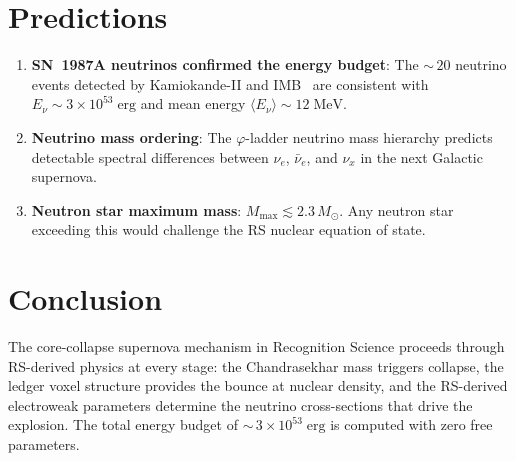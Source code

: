 \documentclass[12pt,a4paper]{article}
\theoremstyle{definition}
\theoremstyle{remark}
\begin{document}
\section{Predictions}
\label{sec:predictions}

\begin{enumerate}
  \item \textbf{SN~1987A neutrinos confirmed the energy budget}:
  The ${\sim}\,20$ neutrino events detected by Kamiokande-II and
  IMB~\cite{Hirata1987} are consistent with
  $E_\nu \sim 3 \times 10^{53}\;\mathrm{erg}$ and mean energy
  $\langle E_\nu \rangle \sim 12\;\mathrm{MeV}$.

  \item \textbf{Neutrino mass ordering}: The $\varphi$-ladder
  neutrino mass hierarchy predicts detectable spectral differences
  between $\nu_e$, $\bar{\nu}_e$, and $\nu_x$ in the next Galactic
  supernova.

  \item \textbf{Neutron star maximum mass}: $M_{\mathrm{max}}
  \lesssim 2.3\,M_\odot$.  Any neutron star exceeding this would
  challenge the RS nuclear equation of state.
\end{enumerate}

\section{Conclusion}
\label{sec:conclusion}

The core-collapse supernova mechanism in Recognition Science
proceeds through RS-derived physics at every stage: the
Chandrasekhar mass triggers collapse, the ledger voxel structure
provides the bounce at nuclear density, and the RS-derived
electroweak parameters determine the neutrino cross-sections
that drive the explosion.  The total energy budget of
${\sim}\,3 \times 10^{53}\;\mathrm{erg}$ is computed with zero
free parameters.
\end{document}
